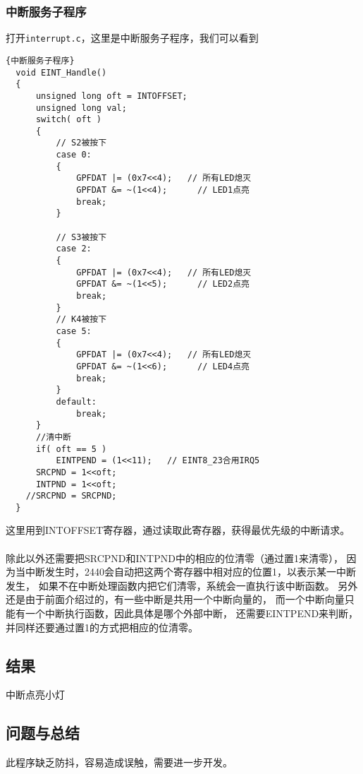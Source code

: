 \subsubsection{中断服务子程序}
打开\lstinline{interrupt.c}，这里是中断服务子程序，我们可以看到
\lstset{language=C}
\begin{lstlisting}{中断服务子程序}
  void EINT_Handle()
  {
      unsigned long oft = INTOFFSET;
      unsigned long val;
      switch( oft )
      {
          // S2被按下
          case 0: 
          {   
              GPFDAT |= (0x7<<4);   // 所有LED熄灭
              GPFDAT &= ~(1<<4);      // LED1点亮
              break;
          }
          
          // S3被按下
          case 2:
          {   
              GPFDAT |= (0x7<<4);   // 所有LED熄灭
              GPFDAT &= ~(1<<5);      // LED2点亮
              break;
          }
          // K4被按下
          case 5:
          {   
              GPFDAT |= (0x7<<4);   // 所有LED熄灭
              GPFDAT &= ~(1<<6);      // LED4点亮                
              break;
          }
          default:
              break;
      }
      //清中断
      if( oft == 5 ) 
          EINTPEND = (1<<11);   // EINT8_23合用IRQ5
      SRCPND = 1<<oft;
      INTPND = 1<<oft;
    //SRCPND = SRCPND;
  }
\end{lstlisting}
这里用到INTOFFSET寄存器，通过读取此寄存器，获得最优先级的中断请求。\\
\\
除此以外还需要把SRCPND和INTPND中的相应的位清零（通过置1来清零），
因为当中断发生时，2440会自动把这两个寄存器中相对应的位置1，以表示某一中断发生，
如果不在中断处理函数内把它们清零，系统会一直执行该中断函数。
另外还是由于前面介绍过的，有一些中断是共用一个中断向量的，
而一个中断向量只能有一个中断执行函数，因此具体是哪个外部中断，
还需要EINTPEND来判断，并同样还要通过置1的方式把相应的位清零。\\

\subsection{结果}
中断点亮小灯
\subsection{问题与总结}
此程序缺乏防抖，容易造成误触，需要进一步开发。